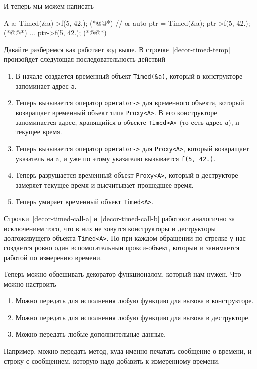 И теперь мы можем написать
\begin{cppcode}
A a;
Timed(&a)->f(5, 42.); (*@@*)
// or
auto ptr = Timed(&a);
ptr->f(5, 42.); (*@@*)
...
ptr->f(5, 42.); (*@@*)
\end{cppcode}
Давайте разберемся как работает код выше.
В строчке~\ref{decor-timed-temp} произойдет следующая последовательность действий
\begin{enumerate}
\item В начале создается временный объект \verb"Timed(&a)", который в конструкторе запоминает адрес \verb"a".

\item Теперь вызывается оператор \verb"operator->" для временного объекта, который возвращает временный объект типа \verb"Proxy<A>".
В его конструкторе запоминается адрес, хранящийся в объекте \verb"Timed<A>" (то есть адрес \verb"a"), и текущее время.

\item Теперь вызывается оператор \verb"operator->" для \verb"Proxy<A>", который возвращает указатель на a, и уже по этому указателю вызывается \verb"f(5, 42.)".

\item Теперь разрушается временный объект \verb"Proxy<A>", который в деструкторе замеряет текущее время и высчитывает прошедшее время.

\item Теперь умирает временный объект \verb"Timed<A>".
\end{enumerate}

Строчки~\ref{decor-timed-call-a} и~\ref{decor-timed-call-b} работают аналогично за исключением того, что в них не зовутся конструкторы и деструкторы долгоживущего объекта \verb"Timed<A>".
Но при каждом обращении по стрелке у нас создается ровно один вспомогательный прокси-объект, который и занимается работой по измерению времени.

Теперь можно обвешивать декоратор функционалом, который нам нужен.
Что можно настроить
\begin{enumerate}
\item Можно передать для исполнения любую функцию для вызова в конструкторе.

\item Можно передать для исполнения любую функцию для вызова в деструкторе.

\item Можно передать любые дополнительные данные.
\end{enumerate}
Например, можно передать метод, куда именно печатать сообщение о времени, и строку с сообщением, которую надо добавить к измеренному времени.

